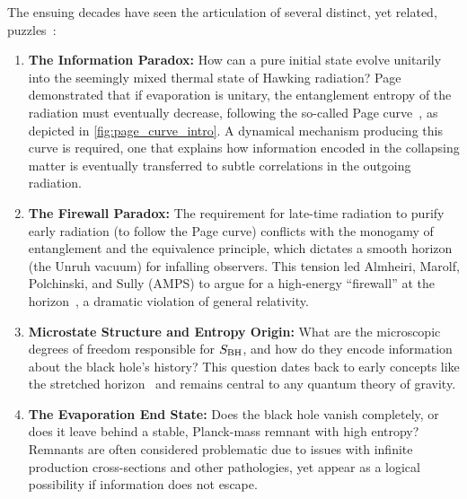 \documentclass[aps,prd,preprint,onecolumn,superscriptaddress,nofootinbib,longbibliography,floatfix,11pt,showpacs,showkeys]{revtex4-2}
\theoremstyle{plain}
\theoremstyle{definition}
\theoremstyle{remark}
\begin{document}
The ensuing decades have seen the articulation of several distinct, yet related, puzzles~\cite{Mathur:2009, Harlow:2016}:
\begin{enumerate}
    \item \textbf{The Information Paradox:} How can a pure initial state evolve unitarily into the seemingly mixed thermal state of Hawking radiation? Page demonstrated that if evaporation is unitary, the entanglement entropy of the radiation must eventually decrease, following the so-called Page curve~\cite{Page:1993}, as depicted in \cref{fig:page_curve_intro}. A dynamical mechanism producing this curve is required, one that explains how information encoded in the collapsing matter is eventually transferred to subtle correlations in the outgoing radiation.
    \item \textbf{The Firewall Paradox:} The requirement for late-time radiation to purify early radiation (to follow the Page curve) conflicts with the monogamy of entanglement and the equivalence principle, which dictates a smooth horizon (the Unruh vacuum) for infalling observers. This tension led Almheiri, Marolf, Polchinski, and Sully (AMPS) to argue for a high-energy ``firewall'' at the horizon~\cite{AMPS:2013}, a dramatic violation of general relativity.
    \item \textbf{Microstate Structure and Entropy Origin:} What are the microscopic degrees of freedom responsible for $S_{\rm BH}$, and how do they encode information about the black hole's history? This question dates back to early concepts like the stretched horizon~\cite{Susskind:1993} and remains central to any quantum theory of gravity.
    \item \textbf{The Evaporation End State:} Does the black hole vanish completely, or does it leave behind a stable, Planck-mass remnant with high entropy? Remnants are often considered problematic due to issues with infinite production cross-sections and other pathologies, yet appear as a logical possibility if information does not escape.
\end{enumerate}
\end{document}
